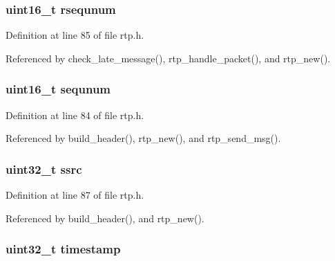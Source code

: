\hypertarget{struct___r_t_p_session_a1bef56c38f8d3bc3ab5d381e11c29d0d}{
\subsubsection[{rsequnum}]{\setlength{\rightskip}{0pt plus 5cm}uint16\+\_\+t rsequnum}}\label{struct___r_t_p_session_a1bef56c38f8d3bc3ab5d381e11c29d0d}


Definition at line 85 of file rtp.\+h.



Referenced by check\+\_\+late\+\_\+message(), rtp\+\_\+handle\+\_\+packet(), and rtp\+\_\+new().

\hypertarget{struct___r_t_p_session_afe208c7dec97b8f61e08094e61bf096e}{
\subsubsection[{sequnum}]{\setlength{\rightskip}{0pt plus 5cm}uint16\+\_\+t sequnum}}\label{struct___r_t_p_session_afe208c7dec97b8f61e08094e61bf096e}


Definition at line 84 of file rtp.\+h.



Referenced by build\+\_\+header(), rtp\+\_\+new(), and rtp\+\_\+send\+\_\+msg().

\hypertarget{struct___r_t_p_session_a7728cdfcf33cc14c0d7ba2dcdcbcdf2e}{
\subsubsection[{ssrc}]{\setlength{\rightskip}{0pt plus 5cm}uint32\+\_\+t ssrc}}\label{struct___r_t_p_session_a7728cdfcf33cc14c0d7ba2dcdcbcdf2e}


Definition at line 87 of file rtp.\+h.



Referenced by build\+\_\+header(), and rtp\+\_\+new().

\hypertarget{struct___r_t_p_session_ab20b0c7772544cf5d318507f34231fbe}{
\subsubsection[{timestamp}]{\setlength{\rightskip}{0pt plus 5cm}uint32\+\_\+t timestamp}}\label{struct___r_t_p_session_ab20b0c7772544cf5d318507f34231fbe}


